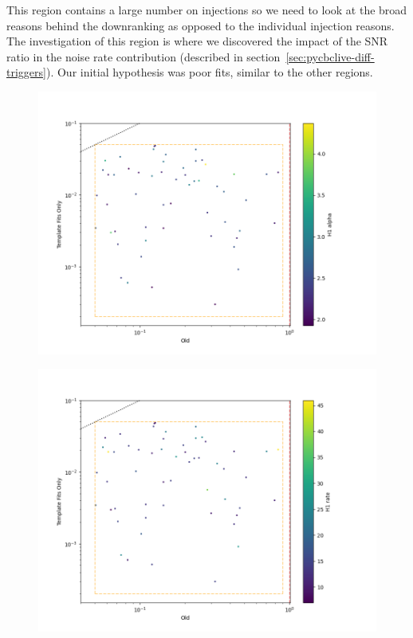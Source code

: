 This region contains a large number on injections so we need to look at the broad reasons behind the downranking as opposed to the individual injection reasons. The investigation of this region is where we discovered the impact of the SNR ratio in the noise rate contribution (described in section~\ref{sec:pycbclive-diff-triggers}). Our initial hypothesis was poor fits, similar to the other regions.
%
\begin{figure}
    \centering
    \includegraphics[width=1\textwidth]{images/5_pycbclive/bl_h1_alpha.png}
    \caption{}
    \label{fig:pycbclive-bottom-left-h1-alpha}
\end{figure}
%
\begin{figure}
    \centering
    \includegraphics[width=1\textwidth]{images/5_pycbclive/bl_h1_rate.png}
    \caption{}
    \label{fig:pycbclive-bottom-left-h1-rate}
\end{figure}
